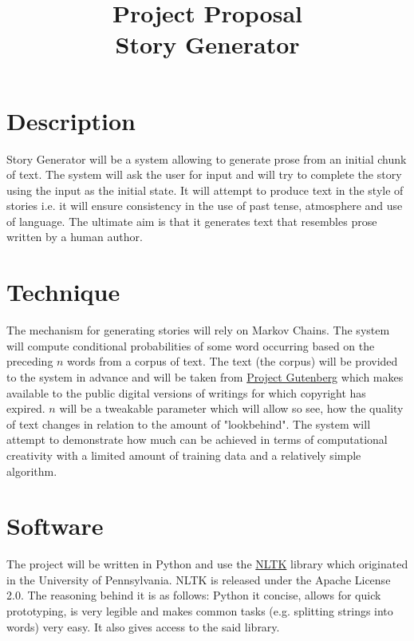 \documentclass[a4paper, 12pt, notitlepage]{article}
\date{} %
\author{}
\title{Project Proposal \\ Story Generator}
\begin{document}
\maketitle

\vspace{-1.5cm}

\section*{Description}

Story Generator will be a system allowing to generate prose from an initial
chunk of text. The system will ask the user for input and will try to complete
the story using the input as the initial state.  It will attempt to produce
text in the style of stories i.e. it will ensure consistency in
the use of past tense, atmosphere and use of language. The ultimate aim is
that it generates text that resembles prose written by a human author.

\section*{Technique}

The mechanism for generating stories will rely on Markov Chains. The system
will compute conditional probabilities of some word occurring
based on the preceding $n$ words from a corpus of text. The text (the
corpus) will be provided to the system in advance and will be taken from
\href{https://www.gutenberg.org/}{Project Gutenberg} which makes available to
the public digital versions of writings for which copyright has expired. $n$
will be a tweakable parameter which will allow so see, how the quality of text
changes in relation to the amount of "lookbehind". The system will attempt
to demonstrate how much can be achieved in terms of computational creativity
with a limited amount of training data and a relatively simple algorithm.

\section*{Software}

The project will be written in Python and use the
\href{http://www.nltk.org/}{NLTK} library which originated in the University
of Pennsylvania. NLTK is released under the Apache License 2.0.
The reasoning behind it is as follows: Python it concise, allows for quick
prototyping, is very legible and makes common tasks (e.g. splitting strings
into words) very easy. It also gives access to the said library.
\end{document}
